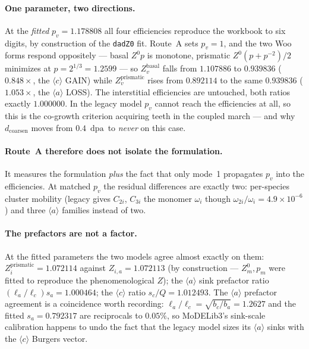 \documentclass[11pt,a4paper]{article}
\newcommand{\code}[1]{\texttt{\small #1}}
\newcommand{\dpa}{\ensuremath{\mathrm{dpa}}}
\newcommand{\aloop}{\ensuremath{\langle a\rangle}}
\newcommand{\cloop}{\ensuremath{\langle c\rangle}}
\begin{document}
\paragraph{One parameter, two directions.} At the \emph{fitted}
$p_v = 1.178808$ all four efficiencies reproduce the workbook to six digits, by
construction of the \code{dadZ0} fit. Route~A sets $p_v = 1$, and the two Woo
forms respond oppositely --- basal $Z^0p$ is monotone, prismatic
$Z^0(p+p^{-2})/2$ minimizes at $p = 2^{1/3} = 1.2599$ --- so
$Z^{\text{basal}}_v$ falls from $1.107886$ to $0.939836$ ($0.848\times$, the
\cloop{} GAIN) while $Z^{\text{prismatic}}_v$ rises from $0.892114$ to the same
$0.939836$ ($1.053\times$, the \aloop{} LOSS). The interstitial efficiencies are
untouched, both ratios exactly $1.000000$. In the legacy model $p_v$ cannot
reach the efficiencies at all, so this is the co-growth criterion acquiring
teeth in the coupled march --- and why $d_{\text{coarsen}}$ moves from
$0.4$~\dpa\ to \emph{never} on this case.

\paragraph{Route~A therefore does not isolate the formulation.} It measures the
formulation \emph{plus} the fact that only mode~1 propagates $p_v$ into the
efficiencies. At matched $p_v$ the residual differences are exactly two:
per-species cluster mobility (legacy gives $C_{2i}$, $C_{3i}$ the monomer
$\omega_i$ though $\omega_{2i}/\omega_i = 4.9\times10^{-6}$) and three \aloop{}
families instead of two.

\paragraph{The prefactors are not a factor.} At the fitted
parameters the two models agree almost exactly on them:
$Z^{\text{prismatic}}_i = 1.072114$ against $Z_{i,a} = 1.072113$ (by
construction --- $Z^0_m, p_m$ were fitted to reproduce the phenomenological
$Z$); the \aloop{} sink prefactor ratio $(\ell_a/\ell_c)s_a = 1.000464$; the
\cloop{} ratio $s_c/Q = 1.012493$. The \aloop{} prefactor agreement is a
coincidence worth recording: $\ell_a/\ell_c = \sqrt{b_c/b_a} = 1.2627$ and the
fitted $s_a = 0.792317$ are reciprocals to $0.05\%$, so MoDELib3's sink-scale
calibration happens to undo the fact that the legacy model sizes its \aloop{}
sinks with the \cloop{} Burgers vector.
\end{document}

